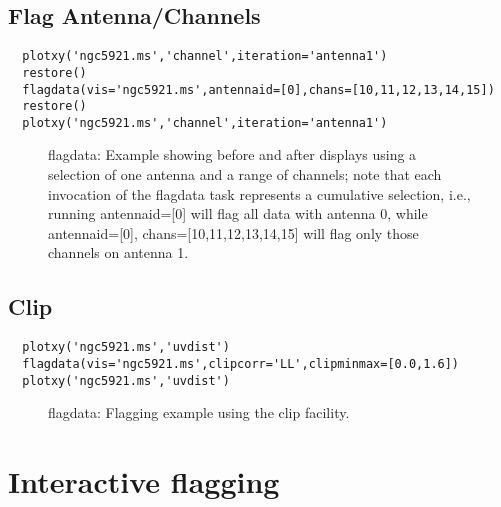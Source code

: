 \subsection{Flag Antenna/Channels}
\label{subsection:flag.ant.chans}

\small
\begin{verbatim}
  plotxy('ngc5921.ms','channel',iteration='antenna1')
  restore()
  flagdata(vis='ngc5921.ms',antennaid=[0],chans=[10,11,12,13,14,15])
  restore()
  plotxy('ngc5921.ms','channel',iteration='antenna1')
\end{verbatim}
\normalsize

\begin{figure}[h!]
\caption{\label{fig:flagdata_antchan} flagdata: Example showing before
  and after displays using a selection of one antenna and a range of
  channels; note that each invocation of the flagdata task represents
  a cumulative selection, i.e., running antennaid=[0] will flag all
  data with antenna 0, while antennaid=[0], chans=[10,11,12,13,14,15]
  will flag only those channels on antenna 1. }
\hrulefill
\end{figure}


\subsection{Clip}
\label{subsection:clip}

\small
\begin{verbatim}
  plotxy('ngc5921.ms','uvdist')
  flagdata(vis='ngc5921.ms',clipcorr='LL',clipminmax=[0.0,1.6])
  plotxy('ngc5921.ms','uvdist')
\end{verbatim}
\normalsize

\begin{figure}[h!]
\caption{\label{fig:flagdata} flagdata: Flagging example using the clip facility. }
\hrulefill
\end{figure}


\section{Interactive flagging}
\label{section:flagging.interactive}

